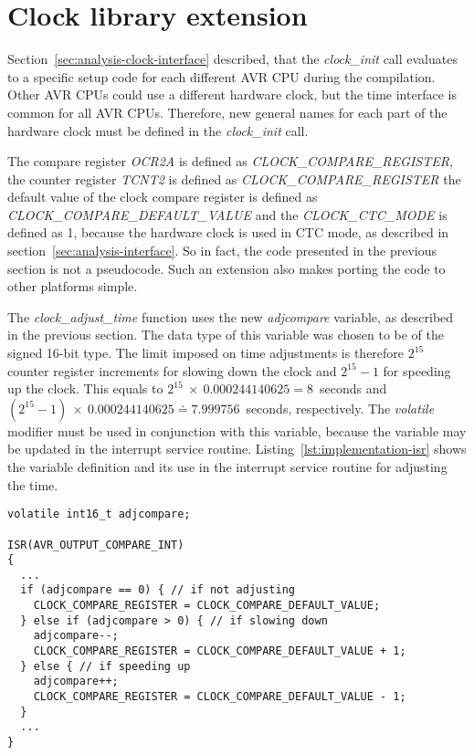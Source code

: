 
\section{Clock library extension}\label{sec:implementation-clock}
Section~\ref{sec:analysis-clock-interface} described, that
the {\it{clock\_init}} call evaluates to a specific setup code
for each different AVR CPU during the compilation.
Other AVR CPUs could use a different hardware clock,
but the time interface is common for all AVR CPUs.
Therefore, new general names for each part of the hardware clock
must be defined in the {\it{clock\_init}} call.

The compare register {\it{OCR2A}} is defined as {\it{CLOCK\_COMPARE\_REGISTER}},
the counter register {\it{TCNT2}} is defined as {\it{CLOCK\_COMPARE\_REGISTER}}
the default value of the clock compare register is defined as {\it{CLOCK\_COMPARE\_DEFAULT\_VALUE}}
and the {\it{CLOCK\_CTC\_MODE}} is defined as 1, because the hardware clock is used in CTC mode,
as described in section~\ref{sec:analysis-interface}.
So in fact, the code presented in the previous section is not a pseudocode.
Such an extension also makes porting the code to other platforms simple.

The {\it{clock\_adjust\_time}} function uses the new {\it{adjcompare}} variable,
as described in the previous section.
The data type of this variable was chosen to be of the signed 16-bit type.
The limit imposed on time adjustments is therefore $2^{15}$ counter register increments %
for slowing down the clock and $2^{15}-1$ for speeding up the clock.
This equals to $2^{15}~\times~0.000244140625 = 8$~seconds
and $(2^{15} - 1)~\times~0.000244140625 \doteq 7.999756$~seconds, respectively.
The {\it{volatile}} modifier must be used in conjunction with this variable,
because the variable may be updated in the interrupt service routine.
Listing~\ref{lst:implementation-isr} shows the variable definition
and its use in the interrupt service routine for adjusting the time.
\begin{lstlisting}[caption={Adjustments pseudocode in interrupt service routine},label={lst:implementation-isr}]
volatile int16_t adjcompare;

ISR(AVR_OUTPUT_COMPARE_INT)
{
  ...
  if (adjcompare == 0) { // if not adjusting
    CLOCK_COMPARE_REGISTER = CLOCK_COMPARE_DEFAULT_VALUE;
  } else if (adjcompare > 0) { // if slowing down
    adjcompare--;
    CLOCK_COMPARE_REGISTER = CLOCK_COMPARE_DEFAULT_VALUE + 1;
  } else { // if speeding up
    adjcompare++;
    CLOCK_COMPARE_REGISTER = CLOCK_COMPARE_DEFAULT_VALUE - 1;
  }
  ...
}
\end{lstlisting}
